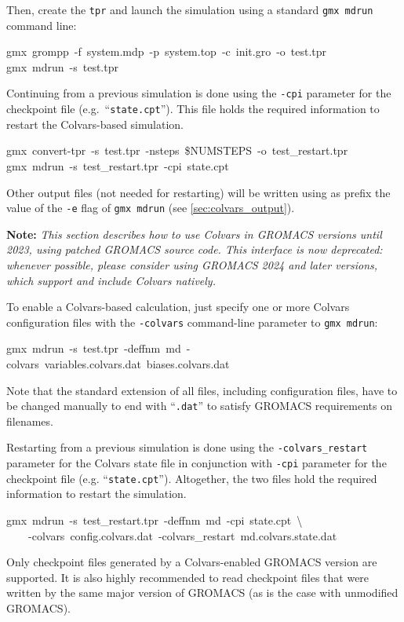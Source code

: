 {\begin{itemize}
\end{itemize}

\noindent{}Then, create the \texttt{tpr} and launch the simulation using a standard \texttt{gmx mdrun} command line:
\begin{mdexampleinput}
\-gmx~grompp~-f~system.mdp~-p~system.top~-c~init.gro~-o~test.tpr\\
\-gmx~mdrun~-s~test.tpr
\end{mdexampleinput}

\noindent{}Continuing from a previous simulation is done using the \texttt{-cpi} parameter for the checkpoint file (e.g.\ ``\texttt{state.cpt}''). This file holds the required information to restart the Colvars-based simulation.
\begin{mdexampleinput}
\-gmx~convert-tpr~-s~test.tpr~-nsteps~\${NUMSTEPS}~-o~test\_restart.tpr\\
\-gmx~mdrun~-s~test\_restart.tpr~-cpi~state.cpt
\end{mdexampleinput}

Other output files (not needed for restarting) will be written using as prefix the value of the \texttt{-e} flag of \texttt{gmx mdrun} (see \ref{sec:colvars_output}).

\else

\textbf{Note:} \emph{This section describes how to use Colvars in GROMACS versions until 2023, using patched GROMACS source code.  This interface is now deprecated: whenever possible, please consider using GROMACS 2024 and later versions, which support and include Colvars natively.}

To enable a Colvars-based calculation, just specify one or more Colvars configuration files with the \texttt{-colvars} command-line parameter to \texttt{gmx mdrun}:
\begin{mdexampleinput}
\-gmx~mdrun~-s~test.tpr~-deffnm~md~-colvars~variables.colvars.dat~biases.colvars.dat
\end{mdexampleinput}
\noindent{}Note that the standard extension of all files, including configuration files, have to be changed manually to end with ``\texttt{.dat}'' to satisfy GROMACS requirements on filenames.

Restarting from a previous simulation is done using the \texttt{-colvars\_restart} parameter for the Colvars state file in conjunction with \texttt{-cpi} parameter for the checkpoint file (e.g.{} ``\texttt{state.cpt}'').
Altogether, the two files hold the required information to restart the simulation.
\begin{mdexampleinput}
\-gmx~mdrun~-s~test\_restart.tpr~-deffnm~md~-cpi~state.cpt~\textbackslash\\
\-~~~~-colvars~config.colvars.dat~-colvars\_restart~md.colvars.state.dat
\end{mdexampleinput}
\noindent{}Only checkpoint files generated by a Colvars-enabled GROMACS version are supported.
It is also highly recommended to read checkpoint files that were written by the same major version of GROMACS (as is the case with unmodified GROMACS).

}
